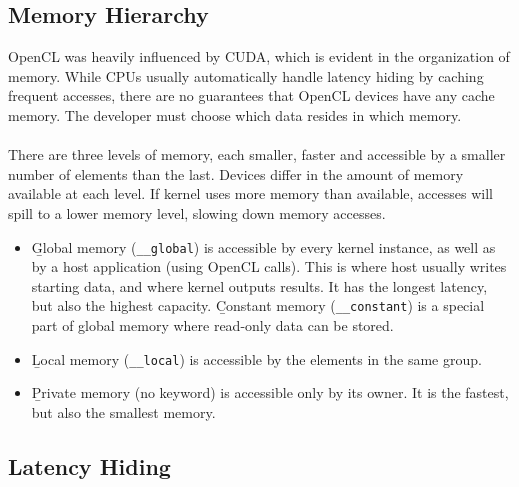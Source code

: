 \subsection{Memory Hierarchy}
OpenCL was heavily influenced by CUDA, which is evident in the organization of memory. While CPUs usually automatically handle latency hiding by caching frequent accesses, there are no guarantees that OpenCL devices have any cache memory. The developer must choose which data resides in which memory.\\
\\
There are three levels of memory, each smaller, faster and accessible by a smaller number of elements than the last. Devices differ in the amount of memory available at each level. If kernel uses more memory than available, accesses will spill to a lower memory level, slowing down memory accesses.
\begin{itemize}
    \item \b{Global memory} (\texttt{\_\_global}) is accessible by every kernel instance, as well as by a host application (using OpenCL calls). This is where host usually writes starting data, and where kernel outputs results. It has the longest latency, but also the highest capacity. \b{Constant memory} (\texttt{\_\_constant}) is a special part of global memory where read-only data can be stored.
    \item \b{Local memory} (\texttt{\_\_local}) is accessible by the elements in the same group.
    \item \b{Private memory} (no keyword) is accessible only by its owner. It is the fastest, but also the smallest memory.
\end{itemize}

\subsection{Latency Hiding}

